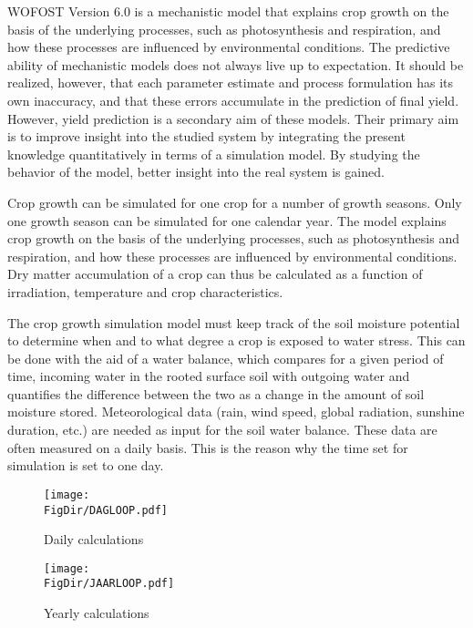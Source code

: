 WOFOST Version 6.0 is a mechanistic model that explains crop growth on the basis
of the underlying processes, such as photosynthesis and respiration, and how these
processes are influenced by environmental conditions. The predictive ability of
mechanistic models does not always live up to expectation. It should be realized,
however, that each parameter estimate and process formulation has its own inaccuracy, 
and that these errors accumulate in the prediction of final yield. However, yield
prediction is a secondary aim of these models. Their primary aim is to improve
insight into the studied system by integrating the present knowledge quantitatively in
terms of a simulation model. By studying the behavior of the model, better insight
into the real system is gained.

Crop growth can be simulated for one crop for a number of growth seasons. Only
one growth season can be simulated for one calendar year.  The model explains crop
growth on the basis of the underlying processes, such as photosynthesis and respiration, 
and how these processes are influenced by environmental conditions.
Dry matter accumulation of a crop can thus be calculated as a function of irradiation,
temperature and crop characteristics.

The crop growth simulation model must keep track of the soil moisture potential to
determine when and to what degree a crop is exposed to water stress. This can be
done with the aid of a water balance, which compares for a given period of time,
incoming water in the rooted surface soil with outgoing water and quantifies the
difference between the two as a change in the amount of soil moisture stored.
Meteorological data (rain, wind speed, global radiation, sunshine duration, etc.) are
needed as input for the soil water balance. These data are often measured on a daily
basis. This is the reason why the time set for simulation is set to one day.

\begin{figure}[htbp]
\centering
\texttt{[image: \\FigDir/DAGLOOP.pdf]}
\caption{Daily calculations}
\label{fig:dayloop}
\end{figure}

\begin{figure}[htbp]
\centering
\texttt{[image: \\FigDir/JAARLOOP.pdf]}
\caption{Yearly calculations}
\label{fig:yearloop}
\end{figure}


